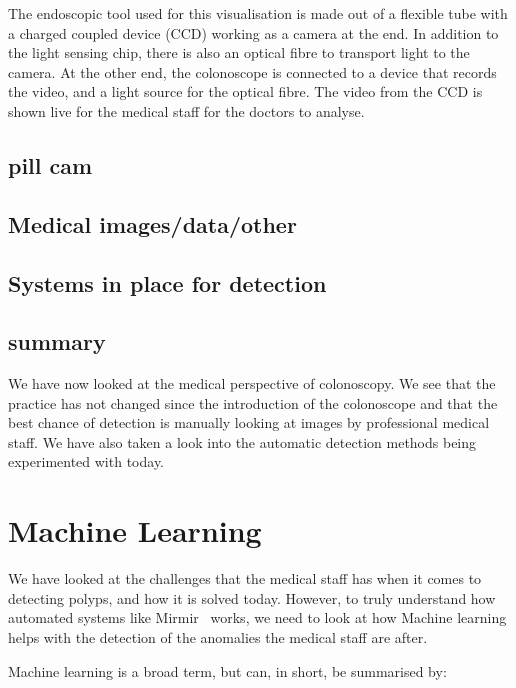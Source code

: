 The endoscopic tool used for this visualisation is made out of a flexible tube with a charged coupled device (CCD) working as a camera at the end. In addition to the light sensing chip, there is also an optical fibre to transport light to the camera. At the other end, the colonoscope is connected to a device that records the video, and a light source for the optical fibre.
The video from the CCD is shown live for the medical staff for the doctors to analyse.
\cite{Colonoscope}


\subsection{pill cam}






\subsection{Medical images/data/other}


    
\subsection{Systems in place for detection}

\subsection{summary}
We have now looked at the medical perspective of colonoscopy. We see that the practice has not changed since the introduction of the colonoscope and that the best chance of detection is manually looking at images by professional medical staff. We have also taken a look into the automatic detection methods being experimented with today.
    

\section{Machine Learning}
We have looked at the challenges that the medical staff has when it comes to detecting polyps, and how it is solved today.
However, to truly understand how automated systems like Mirmir~\cite{Steven2018MimirPaper} works, we need to look at how Machine learning helps with the detection of the anomalies the medical staff are after.  

Machine learning is a broad term, but can, in short, be summarised by:\\
\vspace{10px}

